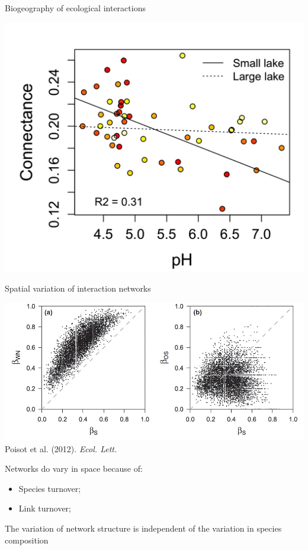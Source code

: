 \documentclass{eecslides}
\begin{document}

	\begin{frame}{Biogeography of ecological interactions}
		\begin{center}
			\includegraphics[height=0.6\textheight]{havens_ph}
		\end{center}   
	\end{frame}


	\begin{frame}{Spatial variation of interaction networks}
		\begin{center}
			\includegraphics[height=0.45\textheight]{poisot2012}\\
			\footnotesize{Poisot et al. (2012). \textit{Ecol. Lett.}}
		\end{center} 
		Networks do vary in space because of:
			\begin{itemize}
				\item Species turnover;
				\item Link turnover;
			\end{itemize}	
		The variation of network structure is independent of the variation in species composition	      
	\end{frame}
\end{document}
